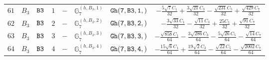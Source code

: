 \documentclass[fleqn,8pt]{jsarticle}
\begin{document}
\begin{table}[ht!]
\begin{center}
\begin{tabular}{cccccccc}
$ 61 $ & $ B_{3} $ & $ {\tt B3} $ & $ 1 $ & $ - $ & $ \mathbb{G}_{7}^{(h,B_{3},1)} $ & $ {\tt Gh(7,B3,1,)} $ & $ - \frac{5 \sqrt{7} C_{1}}{32} + \frac{3 \sqrt{21} C_{3}}{32} - \frac{\sqrt{231} C_{5}}{32} + \frac{\sqrt{429} C_{7}}{32} $ \\
$ 62 $ & $ B_{3} $ & $ {\tt B3} $ & $ 2 $ & $ - $ & $ \mathbb{G}_{7}^{(h,B_{3},2)} $ & $ {\tt Gh(7,B3,2,)} $ & $ - \frac{3 \sqrt{33} C_{1}}{32} - \frac{\sqrt{11} C_{3}}{32} + \frac{25 C_{5}}{32} + \frac{\sqrt{91} C_{7}}{32} $ \\
$ 63 $ & $ B_{3} $ & $ {\tt B3} $ & $ 3 $ & $ - $ & $ \mathbb{G}_{7}^{(h,B_{3},3)} $ & $ {\tt Gh(7,B3,3,)} $ & $ - \frac{\sqrt{858} C_{1}}{64} - \frac{3 \sqrt{286} C_{3}}{64} - \frac{5 \sqrt{26} C_{5}}{64} - \frac{\sqrt{14} C_{7}}{64} $ \\
$ 64 $ & $ B_{3} $ & $ {\tt B3} $ & $ 4 $ & $ - $ & $ \mathbb{G}_{7}^{(h,B_{3},4)} $ & $ {\tt Gh(7,B3,4,)} $ & $ - \frac{15 \sqrt{6} C_{1}}{64} + \frac{19 \sqrt{2} C_{3}}{64} - \frac{\sqrt{22} C_{5}}{64} - \frac{\sqrt{2002} C_{7}}{64} $ \\
 \hline \hline
\end{tabular}
\end{center}
\end{table}
\end{document}
